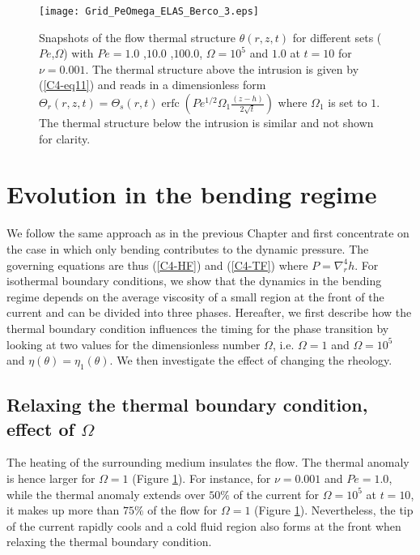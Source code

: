\begin{figure}[h!]
  \begin{center}
    \graphicspath{ {/Users/thorey/Documents/These/Projet/Refroidissement/Skin_Model/Figure/Figure_Heating/} }
    \texttt{[image: Grid\_PeOmega\_ELAS\_Berco\_3.eps]}
    \caption{Snapshots of  the flow thermal  structure $\theta(r,z,t)$
      for  different  sets  ($Pe$,$\Omega$)  with  $Pe=  1.0$  ,$10.0$
      ,$100.0$, $\Omega=10^5$ and $1.0$ at $t=10$ for $\nu=0.001$. The
      thermal   structure   above   the    intrusion   is   given   by
      (\ref{C4-eq11})    and   reads    in   a    dimensionless   form
      $\Theta_r(r,z,t)=\Theta_s(r,t)\operatorname{erfc}{\left(Pe^{1/2}\Omega_1\frac{(z-h)}{2\sqrt{t}}\right)}$
      where $\Omega_1$ is set to  $1$. The thermal structure below the
      intrusion is similar and not shown for clarity.}
    \label{C4-Grid_PeOmega_Heating}
  \end{center}
\end{figure}


\section{Evolution in the bending regime}
\label{C4-sec:evol-bend-regime-1}

We  follow the  same approach  as in  the previous  Chapter and  first
concentrate  on the  case in  which  only bending  contributes to  the
dynamic pressure.  The governing  equations are thus (\ref{C4-HF}) and
(\ref{C4-TF})  where  $P  =  \nabla_r^4h$.   For  isothermal  boundary
conditions, we show that the dynamics in the bending regime depends on
the average  viscosity of a small  region at the front  of the current
and can be divided into three phases. Hereafter, we first describe how
the thermal  boundary condition  influences the  timing for  the phase
transition  by looking  at  two values  for  the dimensionless  number
$\Omega$,     i.e.       $\Omega=1$     and      $\Omega=10^5$     and
$\eta(\theta)=\eta_1(\theta)$.   We  then  investigate the  effect  of
changing the rheology.

\subsection{Relaxing  the   thermal  boundary  condition,   effect  of
  $\Omega$}
\label{C4-sec:infl-therm-bound-el}

The heating of the surrounding  medium insulates the flow. The thermal
anomaly     is     hence     larger     for     $\Omega=1$     (Figure
\ref{C4-Grid_PeOmega_Heating}).   For  instance, for  $\nu=0.001$  and
$Pe=1.0$, while the thermal anomaly extends over $50\%$ of the current
for $\Omega  = 10^5$ at  $t=10$, it makes up  more than $75\%$  of the
flow    for    $\Omega=1$   (Figure    \ref{C4-Grid_PeOmega_Heating}).
Nevertheless, the  tip of the current  rapidly cools and a  cold fluid
region  also forms  at the  front when  relaxing the  thermal boundary
condition.

